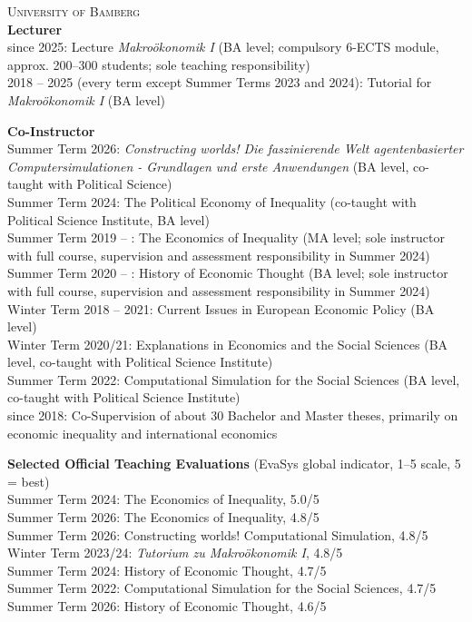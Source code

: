 \documentclass[margin]{res}
\begin{document}
\begin{resume}
	\textsc{University of Bamberg} \\
	\textbf{Lecturer} \\
	since 2025: Lecture \textit{Makro\"okonomik I} (BA level; compulsory 6-ECTS module, approx. 200--300 students; sole  teaching responsibility)\\
	2018 -- 2025 (every term except Summer Terms 2023 and 2024): Tutorial for \textit{Makro\"okonomik I} (BA level)
	
	\textbf{Co-Instructor} \\
	Summer Term 2026: \textit{Constructing worlds! Die faszinierende Welt agentenbasierter Computersimulationen - Grundlagen und erste Anwendungen} (BA level, co-taught with Political Science)\\
	Summer Term 2024: The Political Economy of Inequality (co-taught with Political Science Institute, BA level)\\
	Summer Term 2019 -- : The Economics of Inequality (MA level; sole instructor with full course, supervision and assessment responsibility in Summer 2024)\\
	Summer Term 2020 -- : History of Economic Thought (BA level; sole instructor with full course, supervision and assessment responsibility in Summer 2024)\\
	Winter Term 2018 -- 2021: Current Issues in European Economic Policy (BA level)\\
	Winter Term 2020/21: Explanations in Economics and the Social Sciences (BA level, co-taught with Political Science Institute)\\
	Summer Term 2022: Computational Simulation for the Social Sciences (BA level, co-taught with Political Science Institute)\\
	since 2018: Co-Supervision of about 30 Bachelor and Master theses, primarily on economic inequality and international economics
	
	
	\textbf{Selected Official Teaching Evaluations} (EvaSys global indicator, 1--5 scale, 5 = best)\\
	Summer Term 2024: The Economics of Inequality, 5.0/5\\
	Summer Term 2026: The Economics of Inequality, 4.8/5\\
	Summer Term 2026: Constructing worlds! Computational Simulation, 4.8/5\\
	Winter Term 2023/24: \textit{Tutorium zu Makro\"okonomik I}, 4.8/5\\
	Summer Term 2024: History of Economic Thought, 4.7/5\\
	Summer Term 2022: Computational Simulation for the Social Sciences, 4.7/5\\
	Summer Term 2026: History of Economic Thought, 4.6/5
	

\end{resume}
\end{document}
